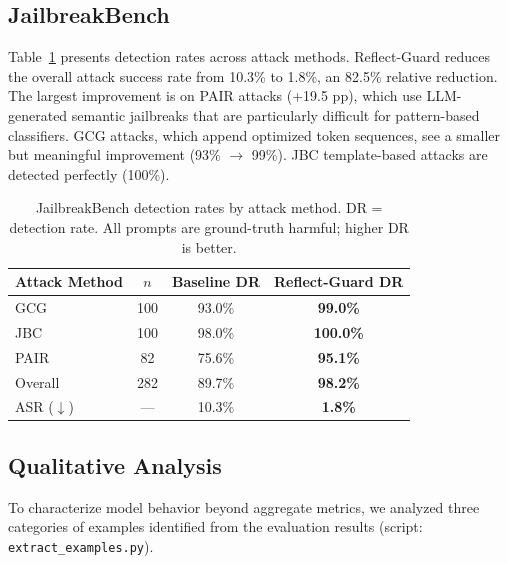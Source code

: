 \documentclass[Superintelligence,article,submit,pdftex,moreauthors]{Definitions/mdpi}
\begin{document}
\subsection{JailbreakBench}

Table~\ref{tab:jailbreakbench} presents detection rates across attack methods. Reflect-Guard reduces the overall attack success rate from 10.3\% to 1.8\%, an 82.5\% relative reduction. The largest improvement is on PAIR attacks (+19.5 pp), which use LLM-generated semantic jailbreaks that are particularly difficult for pattern-based classifiers. GCG attacks, which append optimized token sequences, see a smaller but meaningful improvement (93\% $\to$ 99\%). JBC template-based attacks are detected perfectly (100\%).

\begin{table}[H]
  \caption{JailbreakBench detection rates by attack method. DR = detection rate. All prompts are ground-truth harmful; higher DR is better.\label{tab:jailbreakbench}}
  \centering
  \begin{tabular}{lccc}
    \toprule
    Attack Method & $n$ & Baseline DR & Reflect-Guard DR \\
    \midrule
    GCG  & 100 & 93.0\%  & \textbf{99.0\%}  \\
    JBC  & 100 & 98.0\%  & \textbf{100.0\%} \\
    PAIR &  82 & 75.6\%  & \textbf{95.1\%}  \\
    \midrule
    Overall & 282 & 89.7\% & \textbf{98.2\%} \\
    \midrule
    ASR ($\downarrow$) & --- & 10.3\% & \textbf{1.8\%} \\
    \bottomrule
  \end{tabular}
\end{table}

\subsection{Qualitative Analysis}
\label{sec:qualitative}

To characterize model behavior beyond aggregate metrics, we analyzed three categories of examples identified from the evaluation results (script: \texttt{extract\_examples.py}).
\end{document}
